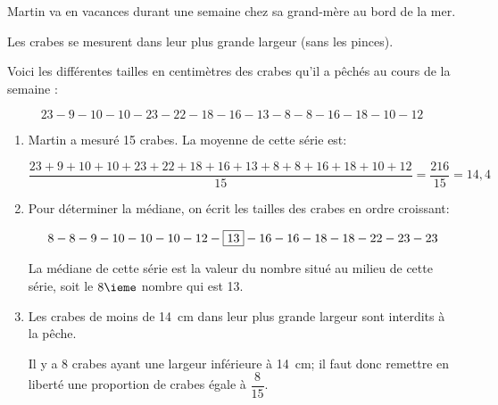 \documentclass[10pt]{article}
\begin{document}
\setlength\parindent{0mm}
\pagestyle{fancy}
\thispagestyle{empty}
    
    
    




\medskip

Martin va en vacances durant une semaine chez sa grand-mère
au bord de la mer.

Les crabes se mesurent dans leur plus grande largeur (sans les pinces).

Voici les différentes tailles en centimètres des crabes qu'il a
pêchés au cours de la semaine :

\[23 - 9 - 10 - 10 - 23 - 22 - 18 - 16 - 13 - 8 - 8 - 16 - 18 - 10 - 12\]

\begin{enumerate}
\item%
Martin a mesuré 15 crabes. La moyenne de cette série est:

$\dfrac{23 + 9 + 10 + 10 + 23 + 22 + 18 + 16 + 13 + 8 + 8 + 16 + 18 + 10 + 12}{15} = \dfrac{216}{15}=14,4 $

\item%
Pour déterminer la médiane, on écrit les tailles des crabes en ordre croissant:

\[ 8 - 8 - 9 - 10 - 10 - 10 - 12 - \fbox{13} - 16 - 16 - 18 - 18 - 22 - 23 - 23\]

La médiane de cette série est la valeur du nombre situé \og{} au milieu\fg{} de cette série, soit le $8\ieme$ nombre qui est 13.

\item Les crabes de moins de 14~cm dans leur plus grande largeur sont interdits à la pêche. 


Il y a 8 crabes ayant une largeur inférieure à 14~cm; il faut donc remettre en liberté une proportion de crabes égale à $\dfrac{8}{15}$.

\end{enumerate}
\end{document}
